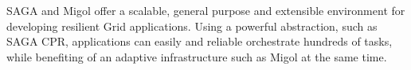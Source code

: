 \documentclass{rspublic}
\newcommand{\jhanote}[1]{ {\textcolor{red} { ***SJ: #1 }}}
\newcommand{\jhanote}[1]{}
\begin{document}
SAGA and Migol offer a scalable, general purpose and extensible environment for developing resilient Grid applications. 
Using a powerful abstraction, such as SAGA CPR, applications can easily and reliable 
orchestrate hundreds of tasks, while benefiting of an adaptive infrastructure such as Migol at the same time.







\end{document}
